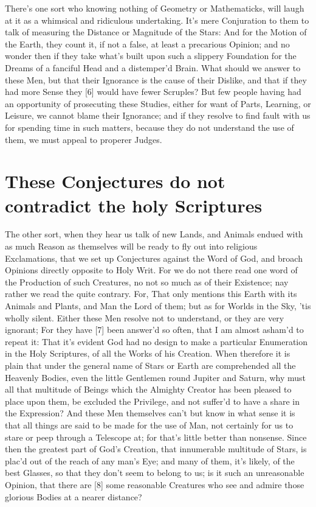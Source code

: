 \documentclass[letterpaper]{book}
\begin{document}
There's one sort who knowing nothing of Geometry or Mathematicks, will laugh
at it as a whimsical and ridiculous undertaking. It's mere Conjuration to
them to talk of measuring the Distance or Magnitude of the Stars: And for
the Motion of the Earth, they count it, if not a false, at least a
precarious Opinion; and no wonder then if they take what's built upon such a
slippery Foundation for the Dreams of a fanciful Head and a distemper'd
Brain.  What should we answer to these Men, but that their Ignorance is the
cause of their Dislike, and that if they had more Sense they [6] would have
fewer Scruples? But few people having had an opportunity of prosecuting
these Studies, either for want of Parts, Learning, or Leisure, we cannot
blame their Ignorance; and if they resolve to find fault with us for
spending time in such matters, because they do not understand the use of
them, we must appeal to properer Judges.


\section{These Conjectures do not contradict the holy Scriptures}

The other sort, when they hear us talk of new Lands, and Animals endued with
as much Reason as themselves will be ready to fly out into religious
Exclamations, that we set up Conjectures against the Word of God, and broach
Opinions directly opposite to Holy Writ. For we do not there read one word
of the Production of such Creatures, no not so much as of their Existence;
nay rather we read the quite contrary. For, That only mentions this Earth
with its Animals and Plants, and Man the Lord of them; but as for Worlds in
the Sky, 'tis wholly silent. Either these Men resolve not to understand, or
they are very ignorant; For they have [7] been answer'd so often, that I am
almost asham'd to repeat it: That it's evident God had no design to make a
particular Enumeration in the Holy Scriptures, of all the Works of his
Creation. When therefore it is plain that under the general name of Stars or
Earth are comprehended all the Heavenly Bodies, even the little Gentlemen
round Jupiter and Saturn, why must all that multitude of Beings which the
Almighty Creator has been pleased to place upon them, be excluded the
Privilege, and not suffer'd to have a share in the Expression?  And these
Men themselves can't but know in what sense it is that all things are said
to be made for the use of Man, not certainly for us to stare or peep through a
Telescope at; for that's little better than nonsense. Since then the
greatest part of God's Creation, that innumerable multitude of Stars, is
plac'd out of the reach of any man's Eye; and many of them, it's likely, of
the best Glasses, so that they don't seem to belong to us; is it such an
unreasonable Opinion, that there are [8] some reasonable Creatures who see
and admire those glorious Bodies at a nearer distance?
\end{document}
